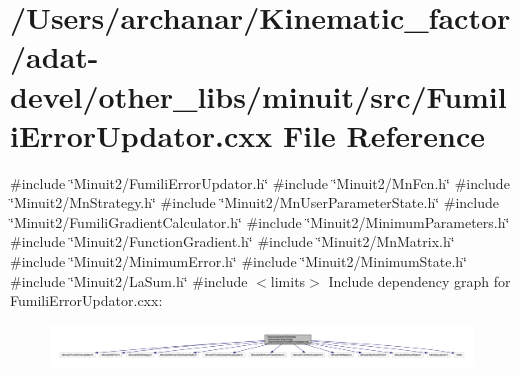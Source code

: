 \hypertarget{adat-devel_2other__libs_2minuit_2src_2FumiliErrorUpdator_8cxx}{}\section{/\+Users/archanar/\+Kinematic\+\_\+factor/adat-\/devel/other\+\_\+libs/minuit/src/\+Fumili\+Error\+Updator.cxx File Reference}
\label{adat-devel_2other__libs_2minuit_2src_2FumiliErrorUpdator_8cxx}
{\ttfamily \#include \char`\"{}Minuit2/\+Fumili\+Error\+Updator.\+h\char`\"{}}\newline
{\ttfamily \#include \char`\"{}Minuit2/\+Mn\+Fcn.\+h\char`\"{}}\newline
{\ttfamily \#include \char`\"{}Minuit2/\+Mn\+Strategy.\+h\char`\"{}}\newline
{\ttfamily \#include \char`\"{}Minuit2/\+Mn\+User\+Parameter\+State.\+h\char`\"{}}\newline
{\ttfamily \#include \char`\"{}Minuit2/\+Fumili\+Gradient\+Calculator.\+h\char`\"{}}\newline
{\ttfamily \#include \char`\"{}Minuit2/\+Minimum\+Parameters.\+h\char`\"{}}\newline
{\ttfamily \#include \char`\"{}Minuit2/\+Function\+Gradient.\+h\char`\"{}}\newline
{\ttfamily \#include \char`\"{}Minuit2/\+Mn\+Matrix.\+h\char`\"{}}\newline
{\ttfamily \#include \char`\"{}Minuit2/\+Minimum\+Error.\+h\char`\"{}}\newline
{\ttfamily \#include \char`\"{}Minuit2/\+Minimum\+State.\+h\char`\"{}}\newline
{\ttfamily \#include \char`\"{}Minuit2/\+La\+Sum.\+h\char`\"{}}\newline
{\ttfamily \#include $<$limits$>$}\newline
Include dependency graph for Fumili\+Error\+Updator.\+cxx\+:
\nopagebreak
\begin{figure}[H]
\begin{center}
\leavevmode
\includegraphics[width=350pt]{de/db7/adat-devel_2other__libs_2minuit_2src_2FumiliErrorUpdator_8cxx__incl}
\end{center}
\end{figure}
